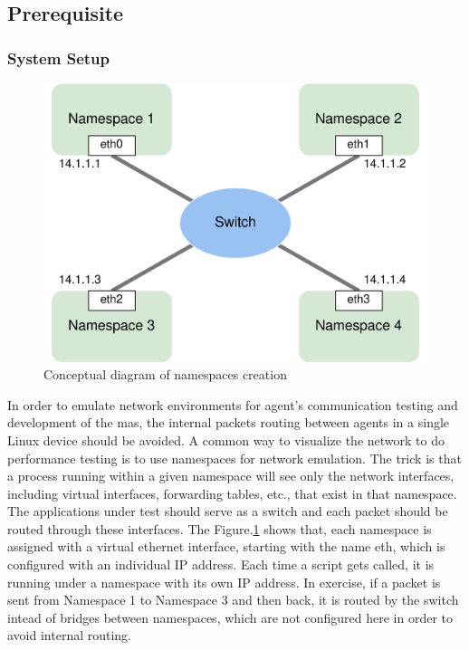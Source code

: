 \subsection{Prerequisite}
\subsubsection{System Setup}
 
\begin{figure}[htbp]
\includegraphics[width=12cm]{figures/NamespaceConceptual.png}
\centering
\caption{Conceptual diagram of namespaces creation
\label{fig: NSConceptual}}
\end{figure}

In order to emulate network environments for agent's communication testing and development of the \gls{mas}, the internal packets routing between agents in a single Linux device should be avoided. A common way to visualize the network to do performance testing is to use namespaces for network emulation. The trick is that a process running within a given namespace will see only the network interfaces, including virtual interfaces, forwarding tables, etc., that exist in that namespace. The applications under test should serve as a switch and each packet should be routed through these interfaces. The Figure.\ref{fig: NSConceptual} shows that, each namespace is assigned with a virtual ethernet interface, starting with the name eth, which is configured with an individual IP address. Each time a script gets called, it is running under a namespace with its own IP address. In exercise, if a packet is sent from Namespace 1 to Namespace 3 and then back, it is routed by the switch intead of bridges between namespaces, which are not configured here in order to avoid internal routing.

